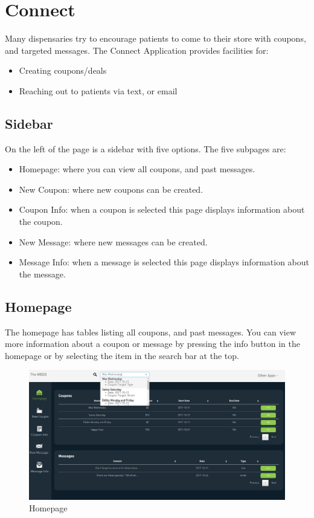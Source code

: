 \documentclass[]{book}
\theoremstyle{definition}
\theoremstyle{definition}
\theoremstyle{definition}
\theoremstyle{remark}
\begin{document}
\chapter{Connect}\label{connect}

Many dispensaries try to encourage patients to come to their store with
coupons, and targeted messages. The Connect Application provides
facilities for:

\begin{itemize}
\item
  Creating coupons/deals
\item
  Reaching out to patients via text, or email
\end{itemize}

\section{Sidebar}\label{sidebar-2}

On the left of the page is a sidebar with five options. The five
subpages are:

\begin{itemize}
\item
  Homepage: where you can view all coupons, and past messages.
\item
  New Coupon: where new coupons can be created.
\item
  Coupon Info: when a coupon is selected this page displays information
  about the coupon.
\item
  New Message: where new messages can be created.
\item
  Message Info: when a message is selected this page displays
  information about the message.
\end{itemize}

\section{Homepage}\label{homepage}

The homepage has tables listing all coupons, and past messages. You can
view more information about a coupon or message by pressing the info
button in the homepage or by selecting the item in the search bar at the
top.

\begin{figure}
\centering
\includegraphics{images/connect1.png}
\caption{Homepage}
\end{figure}
\end{document}
